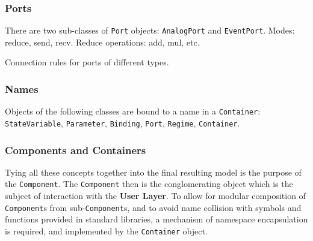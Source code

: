\documentclass[a4paper]{article}
\newcommand\nmlClass[1]{{\tt #1}}
\begin{document}
\subsubsection{Ports}

There are two sub-classes of \nmlClass{Port} objects: \nmlClass{AnalogPort} and \nmlClass{EventPort}.
Modes: reduce, send, recv.  
Reduce operations: add, mul, etc.

Connection rules for ports of different types.


\subsubsection{Names}

Objects of the following classes are bound to a name in a \nmlClass{Container}:
\nmlClass{StateVariable}, \nmlClass{Parameter}, \nmlClass{Binding},
\nmlClass{Port}, \nmlClass{Regime}, \nmlClass{Container}.

\subsubsection{Components and Containers}

Tying all these concepts together into the final resulting model is
the purpose of the \nmlClass{Component}.  The \nmlClass{Component} then is the
conglomerating object which is the subject of interaction with the
\textbf{User Layer}.  To allow for modular composition of \nmlClass{Component}s
from sub-\nmlClass{Component}s, and to avoid name collision with symbols and
functions provided in standard libraries, a mechanism of namespace
encapsulation is required, and implemented by the \nmlClass{Container} object.
\end{document}
